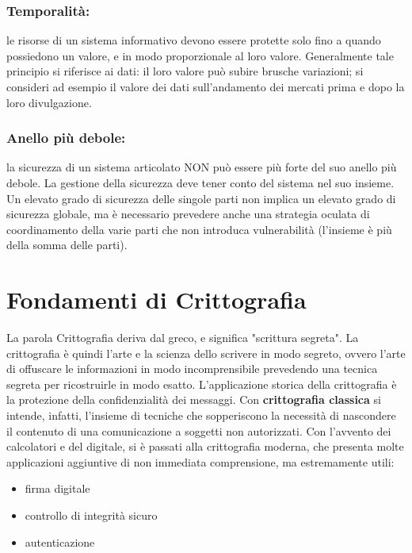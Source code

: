 \subsubsection{Temporalità:}  le risorse di un sistema informativo devono essere protette solo fino a quando possiedono un valore, e in modo proporzionale al loro valore. Generalmente tale principio si riferisce ai dati: il loro valore può subire brusche variazioni; si consideri ad esempio il valore dei dati sull’andamento dei mercati prima e dopo la loro divulgazione.

\subsubsection{Anello più debole:}  la sicurezza di un sistema articolato NON può essere più forte del suo anello più debole. La gestione della sicurezza deve tener conto del sistema nel suo insieme. Un elevato grado di sicurezza delle singole parti non implica un elevato grado di sicurezza globale, ma è necessario prevedere anche una strategia oculata di coordinamento della varie parti che non introduca vulnerabilità  (l'insieme è più della somma delle parti).

\section{Fondamenti di Crittografia}
La parola Crittografia deriva dal greco, e significa "scrittura segreta". La crittografia è quindi l’arte e la scienza dello scrivere in modo segreto, ovvero l’arte di offuscare le informazioni in modo incomprensibile prevedendo una tecnica segreta per ricostruirle in modo esatto. L’applicazione storica della crittografia è la protezione della confidenzialità dei messaggi. Con \textbf{crittografia classica} si intende, infatti, l'insieme di tecniche che sopperiscono la necessità di nascondere il contenuto di una comunicazione a soggetti non autorizzati. Con l'avvento dei calcolatori e del digitale, si è passati alla crittografia moderna, che presenta molte applicazioni aggiuntive di non immediata comprensione, ma estremamente utili:
\begin{itemize} 
  \item firma digitale
  \item controllo di integrità sicuro
  \item autenticazione
\end{itemize}

